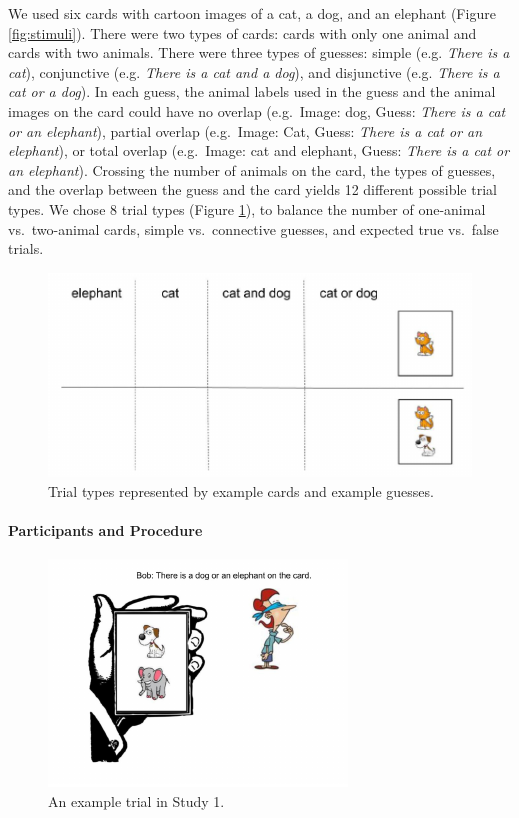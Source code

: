 \documentclass[floatsintext,man]{apa6}
\theoremstyle{definition}
\theoremstyle{definition}
\theoremstyle{definition}
\theoremstyle{remark}
\begin{document}
We used six cards with cartoon images of a cat, a dog, and an elephant
(Figure \ref{fig:stimuli}). There were two types of cards: cards with
only one animal and cards with two animals. There were three types of
guesses: simple (e.g. \emph{There is a cat}), conjunctive (e.g.
\emph{There is a cat and a dog}), and disjunctive (e.g. \emph{There is a
cat or a dog}). In each guess, the animal labels used in the guess and
the animal images on the card could have no overlap (e.g.~Image: dog,
Guess: \emph{There is a cat or an elephant}), partial overlap
(e.g.~Image: Cat, Guess: \emph{There is a cat or an elephant}), or total
overlap (e.g.~Image: cat and elephant, Guess: \emph{There is a cat or an
elephant}). Crossing the number of animals on the card, the types of
guesses, and the overlap between the guess and the card yields 12
different possible trial types. We chose 8 trial types (Figure
\ref{fig:trials}), to balance the number of one-animal vs.~two-animal
cards, simple vs.~connective guesses, and expected true vs.~false
trials.

\begin{figure}[!h]

{\centering \includegraphics{figs/trials-1} 

}

\caption{Trial types represented by example cards and example guesses.}\label{fig:trials}
\end{figure}

\paragraph{Participants and Procedure}\label{participants-and-procedure}

\begin{figure}[!h]

{\centering \includegraphics{figs/exampleTrial-1} 

}

\caption{An example trial in Study 1.}\label{fig:exampleTrial}
\end{figure}
\end{document}
